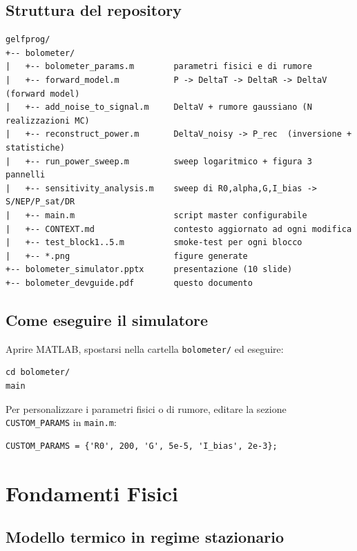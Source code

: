 \documentclass[11pt,a4paper]{article}
\begin{document}
\subsection*{Struttura del repository}

\begin{verbatim}
gelfprog/
+-- bolometer/
|   +-- bolometer_params.m        parametri fisici e di rumore
|   +-- forward_model.m           P -> DeltaT -> DeltaR -> DeltaV  (forward model)
|   +-- add_noise_to_signal.m     DeltaV + rumore gaussiano (N realizzazioni MC)
|   +-- reconstruct_power.m       DeltaV_noisy -> P_rec  (inversione + statistiche)
|   +-- run_power_sweep.m         sweep logaritmico + figura 3 pannelli
|   +-- sensitivity_analysis.m    sweep di R0,alpha,G,I_bias -> S/NEP/P_sat/DR
|   +-- main.m                    script master configurabile
|   +-- CONTEXT.md                contesto aggiornato ad ogni modifica
|   +-- test_block1..5.m          smoke-test per ogni blocco
|   +-- *.png                     figure generate
+-- bolometer_simulator.pptx      presentazione (10 slide)
+-- bolometer_devguide.pdf        questo documento
\end{verbatim}

\subsection*{Come eseguire il simulatore}

Aprire MATLAB, spostarsi nella cartella \texttt{bolometer/} ed eseguire:

\begin{lstlisting}[caption={Esecuzione rapida con parametri default}]
cd bolometer/
main
\end{lstlisting}

Per personalizzare i parametri fisici o di rumore, editare la sezione
\texttt{CUSTOM\_PARAMS} in \texttt{main.m}:

\begin{lstlisting}[caption={Override parametri in main.m}]
CUSTOM_PARAMS = {'R0', 200, 'G', 5e-5, 'I_bias', 2e-3};
\end{lstlisting}

\section{Fondamenti Fisici}

\subsection{Modello termico in regime stazionario}
\end{document}
